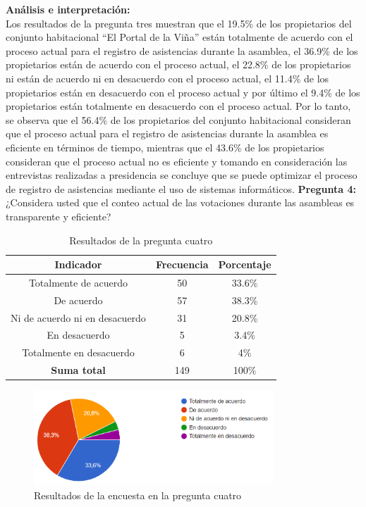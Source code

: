 \textbf{Análisis e interpretación:}\\
Los resultados de la pregunta tres muestran que el 19.5\% de los propietarios del conjunto habitacional {\textquotedblleft}El Portal de la Viña{\textquotedblright} están totalmente de acuerdo con el proceso actual para el registro de asistencias durante la asamblea, el 36.9\% de los propietarios están de acuerdo con el proceso actual, el 22.8\% de los propietarios ni están de acuerdo ni en desacuerdo con el proceso actual, el 11.4\% de los propietarios están en desacuerdo con el proceso actual y por último el 9.4\% de los propietarios están totalmente en desacuerdo con el proceso actual.
Por lo tanto, se observa que el 56.4\% de los propietarios del conjunto habitacional consideran que el proceso actual para el registro de asistencias durante la asamblea es eficiente en términos de tiempo, mientras que el 43.6\% de los propietarios consideran que el proceso actual no es eficiente y tomando en consideración las entrevistas realizadas a presidencia se concluye que se puede optimizar el proceso de registro de asistencias mediante el uso de sistemas informáticos.
\bigbreak
\textbf{Pregunta 4:} ¿Considera usted que el conteo actual de las votaciones durante las asambleas es transparente y eficiente?
    \begin{table}[H]
        \centering
        \caption{Resultados de la pregunta cuatro}
        \begin{tabular}{|c|c|c|}
            \hline
            \textbf{Indicador} & \textbf{Frecuencia} &  \textbf{Porcentaje} \\
            \hline
            Totalmente de acuerdo & 50 & 33.6\% \\
            \hline
            De acuerdo & 57 & 38.3\% \\
            \hline
            Ni de acuerdo ni en desacuerdo & 31 & 20.8\% \\
            \hline
            En desacuerdo & 5 & 3.4\% \\
            \hline
            Totalmente en desacuerdo & 6 & 4\% \\
            \hline
            \textbf{Suma total} & 149 & 100\% \\
            \hline
        \end{tabular}\label{tab:table_preg_4}
    \end{table}
    \begin{figure}[H]
        \centering
        \includegraphics[width=0.8\textwidth]{resources/images/p4}
        \caption{Resultados de la encuesta en la pregunta cuatro}\label{fig:figure_p4}
    \end{figure}

